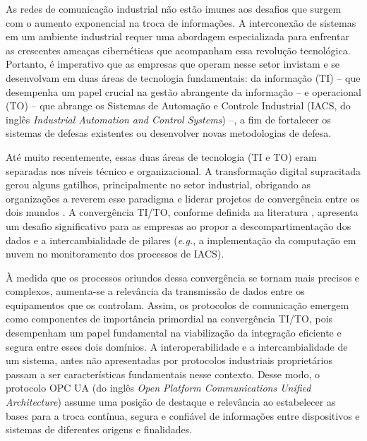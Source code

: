     As redes de comunicação industrial não estão imunes aos desafios que surgem com o aumento exponencial na troca de informações. A interconexão de sistemas em um ambiente industrial requer uma abordagem especializada para enfrentar as crescentes ameaças cibernéticas que acompanham essa revolução tecnológica. Portanto, é imperativo que as empresas que operam nesse setor invistam e se desenvolvam em duas áreas de tecnologia fundamentais: da informação (TI) -- que desempenha um papel crucial na gestão abrangente da informação -- e operacional (TO) -- que abrange os Sistemas de Automação e Controle Industrial (IACS, do inglês \textit{Industrial Automation and Control Systems}) --, a fim de fortalecer os sistemas de defesas existentes ou desenvolver novas metodologias de defesa.
    
    Até muito recentemente, essas duas áreas de tecnologia (TI e TO) eram separadas nos níveis técnico e organizacional. A transformação digital supracitada gerou alguns gatilhos, principalmente no setor industrial, obrigando as organizações a reverem esse paradigma e liderar projetos de convergência entre os dois mundos \cite{yassine2021}. A convergência TI/TO, conforme definida na literatura \cite{yassine2021,tian2019,garimella2018}, apresenta um desafio significativo para as empresas ao propor a descompartimentação dos dados e a intercambialidade de pilares (\textit{e.g.}, a implementação da computação em nuvem no monitoramento dos processos de IACS).

    À medida que os processos oriundos dessa convergência se tornam mais precisos e complexos, aumenta-se a relevância da transmissão de dados entre os equipamentos que os controlam. Assim, os protocolos de comunicação emergem como componentes de importância primordial na convergência TI/TO, pois desempenham um papel fundamental na viabilização da integração eficiente e segura entre esses dois domínios. A interoperabilidade e a intercambialidade de um sistema, antes não apresentadas por protocolos industriais proprietários passam a ser características fundamentais nesse contexto. Desse modo, o protocolo OPC UA (do inglês \textit{Open Platform Communications Unified Architecture}) assume uma posição de destaque e relevância ao estabelecer as bases para a troca contínua, segura e confiável de informações entre dispositivos e sistemas de diferentes origens e finalidades.

